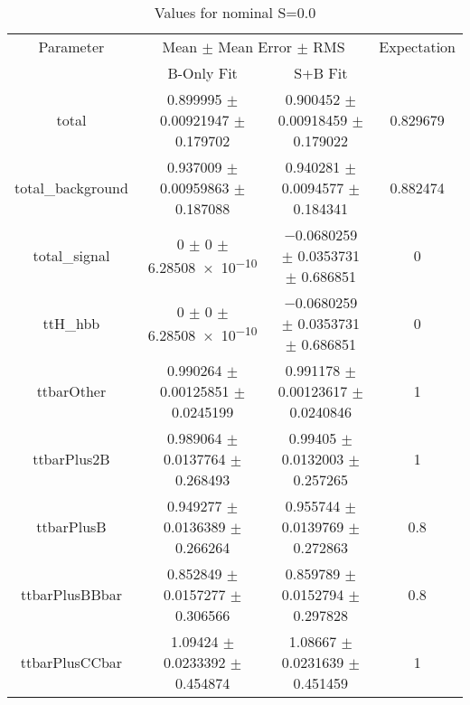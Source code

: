 \begin{table}
\centering
\caption{Values for nominal S=0.0}
\begin{tabular}{cccc}
\toprule
Parameter & \multicolumn{2}{c}{Mean $\pm$ Mean Error $\pm$ RMS} & Expectation\\
 & B-Only Fit & S+B Fit & \\
\midrule
total & \num{0.899995} $\pm$ \num{0.00921947} $\pm$ \num{0.179702} & \num{0.900452} $\pm$ \num{0.00918459} $\pm$ \num{0.179022} & \num{0.829679}\\
total\_background & \num{0.937009} $\pm$ \num{0.00959863} $\pm$ \num{0.187088} & \num{0.940281} $\pm$ \num{0.0094577} $\pm$ \num{0.184341} & \num{0.882474}\\
total\_signal & \num{0} $\pm$ \num{0} $\pm$ \num{6.28508e-10} & \num{-0.0680259} $\pm$ \num{0.0353731} $\pm$ \num{0.686851} & \num{0}\\
ttH\_hbb & \num{0} $\pm$ \num{0} $\pm$ \num{6.28508e-10} & \num{-0.0680259} $\pm$ \num{0.0353731} $\pm$ \num{0.686851} & \num{0}\\
ttbarOther & \num{0.990264} $\pm$ \num{0.00125851} $\pm$ \num{0.0245199} & \num{0.991178} $\pm$ \num{0.00123617} $\pm$ \num{0.0240846} & \num{1}\\
ttbarPlus2B & \num{0.989064} $\pm$ \num{0.0137764} $\pm$ \num{0.268493} & \num{0.99405} $\pm$ \num{0.0132003} $\pm$ \num{0.257265} & \num{1}\\
ttbarPlusB & \num{0.949277} $\pm$ \num{0.0136389} $\pm$ \num{0.266264} & \num{0.955744} $\pm$ \num{0.0139769} $\pm$ \num{0.272863} & \num{0.8}\\
ttbarPlusBBbar & \num{0.852849} $\pm$ \num{0.0157277} $\pm$ \num{0.306566} & \num{0.859789} $\pm$ \num{0.0152794} $\pm$ \num{0.297828} & \num{0.8}\\
ttbarPlusCCbar & \num{1.09424} $\pm$ \num{0.0233392} $\pm$ \num{0.454874} & \num{1.08667} $\pm$ \num{0.0231639} $\pm$ \num{0.451459} & \num{1}\\
\bottomrule
\end{tabular}
\end{table}